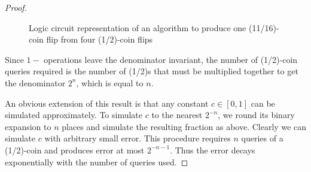 \documentclass{article}
\theoremstyle{definition}
\begin{document}
\begin{proof}
\begin{figure}
\caption{Logic circuit representation of an algorithm to produce one (11/16)-coin flip from four (1/2)-coin flips}\label{fig:const_circuit}
\end{figure}

Since $1-$ operations leave the denominator invariant, the number of (1/2)-coin queries required is the number of (1/2)s that must be multiplied together to get the denominator $2^n$, which is equal to $n$. 

An obvious extension of this result is that any constant $c \in [0,1]$ can be simulated approximately. To simulate $c$ to the nearest $2^{-n}$, we round its binary expansion to $n$ places and simulate the resulting fraction as above. Clearly we can simulate $c$ with arbitrary small error. This procedure requires $n$ queries of a (1/2)-coin and produces error at most $2^{-n-1}$. Thus the error decays exponentially with the number of queries used.
\end{proof}



\end{document}
